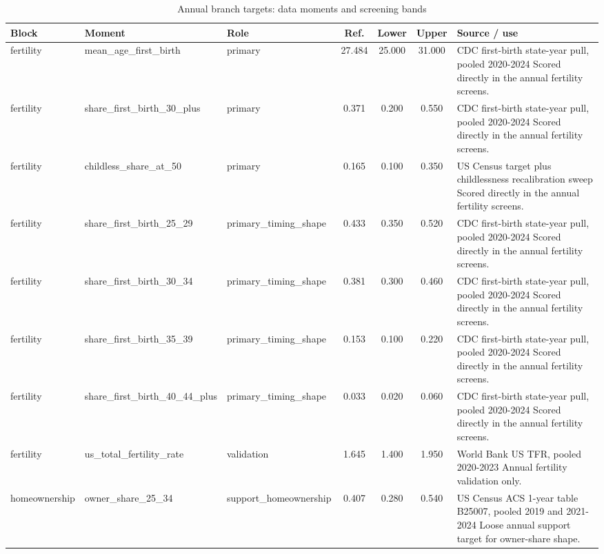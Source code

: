 \begin{table}[H]
\caption{Annual branch targets: data moments and screening bands}
\label{tab:annual_targeted_moments}
\centering
\scriptsize
\setlength{\tabcolsep}{3pt}
\renewcommand{\arraystretch}{1.03}
\begin{tabularx}{0.98\linewidth}{@{}>{\raggedright\arraybackslash}p{1.25cm}>{\raggedright\arraybackslash}p{3.10cm}>{\raggedright\arraybackslash}p{1.80cm}ccc>{\raggedright\arraybackslash}X@{}}
\toprule
Block & Moment & Role & Ref. & Lower & Upper & Source / use \\
\midrule
fertility & mean\_age\_first\_birth & primary & 27.484 & 25.000 & 31.000 & CDC first-birth state-year pull, pooled 2020-2024 Scored directly in the annual fertility screens. \\
fertility & share\_first\_birth\_30\_plus & primary & 0.371 & 0.200 & 0.550 & CDC first-birth state-year pull, pooled 2020-2024 Scored directly in the annual fertility screens. \\
fertility & childless\_share\_at\_50 & primary & 0.165 & 0.100 & 0.350 & US Census target plus childlessness recalibration sweep Scored directly in the annual fertility screens. \\
fertility & share\_first\_birth\_25\_29 & primary\_timing\_shape & 0.433 & 0.350 & 0.520 & CDC first-birth state-year pull, pooled 2020-2024 Scored directly in the annual fertility screens. \\
fertility & share\_first\_birth\_30\_34 & primary\_timing\_shape & 0.381 & 0.300 & 0.460 & CDC first-birth state-year pull, pooled 2020-2024 Scored directly in the annual fertility screens. \\
fertility & share\_first\_birth\_35\_39 & primary\_timing\_shape & 0.153 & 0.100 & 0.220 & CDC first-birth state-year pull, pooled 2020-2024 Scored directly in the annual fertility screens. \\
fertility & share\_first\_birth\_40\_44\_plus & primary\_timing\_shape & 0.033 & 0.020 & 0.060 & CDC first-birth state-year pull, pooled 2020-2024 Scored directly in the annual fertility screens. \\
fertility & us\_total\_fertility\_rate & validation & 1.645 & 1.400 & 1.950 & World Bank US TFR, pooled 2020-2023 Annual fertility validation only. \\
homeownership & owner\_share\_25\_34 & support\_homeownership & 0.407 & 0.280 & 0.540 & US Census ACS 1-year table B25007, pooled 2019 and 2021-2024 Loose annual support target for owner-share shape. \\

\end{tabularx}
\end{table}
